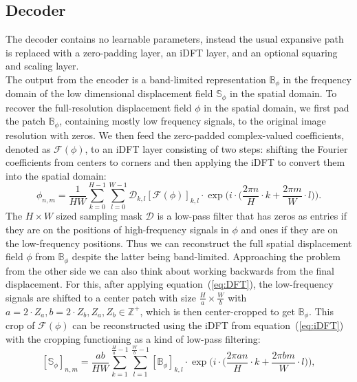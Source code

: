 \documentclass[english,version-2022-01]{uzl-thesis} %
\begin{document}
\subsection{Decoder} \label{SubSec:Decoder}
The decoder contains no learnable parameters, instead the usual expansive path is replaced with a zero-padding layer, an iDFT layer, and an optional squaring and scaling layer. \\
The output from the encoder is a band-limited representation $\mathbb{B}_\phi$ in the frequency domain of the low dimensional displacement field $\mathbb{S}_\phi$ in the spatial domain. To recover the full-resolution displacement field $\phi$ in the spatial domain, we first pad the patch $\mathbb{B}_\phi$, containing mostly low frequency signals, to the original image resolution with zeros. We then feed the zero-padded complex-valued coefficients, denoted as $\mathcal{F}(\phi)$, to an iDFT layer consisting of two steps: shifting the Fourier coefficients from centers to corners and then applying the iDFT to convert them into the spatial domain:
\begin{equation} \label{eq:iDFT}
	\phi_{n,m} = \frac{1}{HW} \sum^{H-1}_{k=0} \sum^{W-1}_{l=0} \mathcal{D}_{k,l} [\mathcal{F}(\phi)]_{k,l} \cdot \exp \Bigg(i \cdot \bigg(\frac{2 \pi n}{H} \cdot k + \frac{2 \pi m}{W} \cdot l \bigg) \Bigg).
\end{equation}
The $H \times W$ sized sampling mask $\mathcal{D}$ is a low-pass filter that has zeros as entries if they are on the positions of high-frequency signals in $\phi$ and ones if they are on the low-frequency positions. Thus we can reconstruct the full spatial displacement field $\phi$ from $\mathbb{B}_\phi$ despite the latter being band-limited. Approaching the problem from the other side we can also think about working backwards from the final displacement. For this, after applying equation~(\ref{eq:DFT}), the low-frequency signals are shifted to a center patch with size $\frac{H}{a} \times \frac{W}{b}$ with $a = 2 \cdot Z_a, b = 2 \cdot Z_b, Z_a, Z_b \in \mathbb{Z}^+$, which is then center-cropped to get $\mathbb{B}_\phi$. This crop of $\mathcal{F}(\phi)$ can be reconstructed using the iDFT from equation~(\ref{eq:iDFT}) with the cropping functioning as a kind of low-pass filtering:
\begin{equation} \label{eq:decoder}
	[\mathbb{S}_\phi]_{n,m} = \frac{ab}{HW} \sum^{\frac{H}{a}-1}_{k=1} \sum^{\frac{W}{b}-1}_{l=1} [\mathbb{B}_\phi]_{k,l} \cdot \exp \Bigg(i \cdot \bigg(\frac{2 \pi a n}{H} \cdot k + \frac{2 \pi b m}{W} \cdot l \bigg) \Bigg),
\end{equation}
\end{document}
